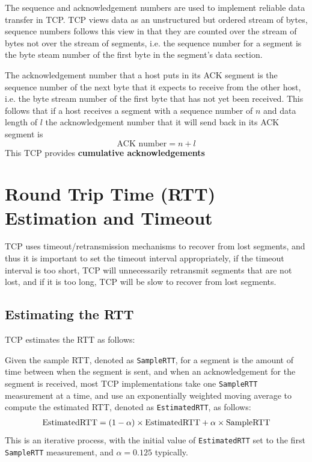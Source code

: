 \documentclass[12pt letter]{report}
\begin{document}
The sequence and acknowledgement numbers are used to implement
reliable data transfer in TCP. TCP views data as an unstructured but
ordered stream of bytes, sequence numbers follows this view in that
they are counted over the stream of bytes not over the stream of
segments, i.e. the sequence number for a segment is the byte steam
number of the first byte in the segment's data section.


The acknowledgement number that a host puts in its ACK segment is the
sequence number of the next byte that it expects to receive from the
other host, i.e. the byte stream number of the first byte that has
not yet been received. This follows that if a host receives a segment
with a sequence number of $n$ and data length of $l$ the
acknowledgement number that it will send back in its ACK segment is
\[
  \text{ACK number} = n + l
\]
This TCP provides \textbf{cumulative acknowledgements}

\section{Round Trip Time (RTT) Estimation and Timeout}

TCP uses timeout/retransmission mechanisms to recover from lost
segments, and thus it is important to set the timeout interval
appropriately, if the timeout interval is too short, TCP will
unnecessarily retransmit segments that are not lost, and if it is too
long, TCP will be slow to recover from lost segments.

\subsection{Estimating the RTT}

TCP estimates the RTT as follows:

Given the sample RTT, denoted as \lstinline{SampleRTT}, for a segment
is the amount of time between when the segment is sent, and when an
acknowledgement for the segment is received, most  TCP
implementations take one \lstinline{SampleRTT} measurement at a time,
and use an exponentially weighted moving average to compute the
estimated RTT, denoted as \lstinline{EstimatedRTT}, as follows:
\begin{align*}
  \text{\lstinline{EstimatedRTT}} = (1 - \alpha) \times
  \text{\lstinline{EstimatedRTT}} + \alpha \times \text{\lstinline{SampleRTT}}
\end{align*}
This is an iterative process, with the initial value of
\lstinline{EstimatedRTT} set to the first \lstinline{SampleRTT}
measurement, and $\alpha = 0.125$ typically.
\end{document}
